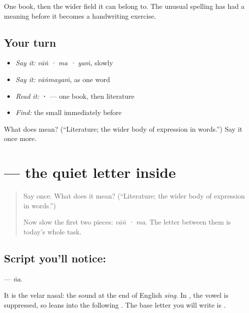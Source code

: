 \begin{grammarlens}[title={What you've built}]
One book, then the wider field it can belong to. The unusual spelling has had a meaning before it becomes a handwriting exercise.
\end{grammarlens}

\subsection*{Your turn}
\begin{itemize}
\raggedright
  \item \emph{Say it:} \emph{vāṅ · ma · yaṁ}, slowly
  \item \emph{Say it:} \emph{vāṅmayaṁ}, as one word
  \item \emph{Read it:} \textbf{ · } — one book, then literature
  \item \emph{Find:} the small \textbf{} immediately before \textbf{}
\end{itemize}

\begin{tcolorbox}[breakable,colback=teal!4,colframe=teal!35!black,title={Before you move on}]
What does \textbf{} mean? (\textquotedblleft{}Literature; the wider body of expression in words.\textquotedblright{}) Say it once more.
\end{tcolorbox}
\section[\texorpdfstring{\te{ఙ} (ṅa)}{ఙ (ṅa)}]{ — the quiet letter inside }

\label{lesson:TE-S171-letter-nga}



\begin{quote}
Say \textbf{} once. What does it mean? (\textquotedblleft{}Literature; the wider body of expression in words.\textquotedblright{})

Now slow the first two pieces: \emph{vāṅ · ma}. The letter between them is today's whole task.
\end{quote}

\subsection*{Script you'll notice: }
\textbf{} — \emph{ṅa}.

It is the velar nasal: the sound at the end of English \emph{sing}. In \textbf{}, the vowel is suppressed, so \textbf{} leans into the following \textbf{}. The base letter you will write is \textbf{}.

